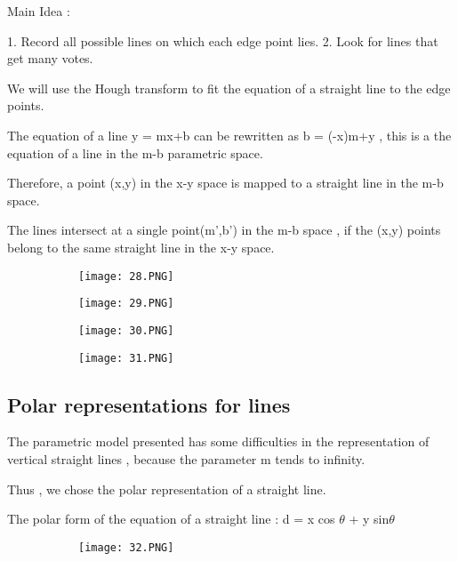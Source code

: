 \documentclass{article}
\begin{document}
Main Idea : 

1. Record all possible lines on which each edge point lies.
2. Look for lines that get many votes.

We will use the Hough transform to fit the equation of a straight line to the edge points.

The equation of a line y = mx+b can be rewritten as b = (-x)m+y , this is a the equation of a line in the m-b parametric space.

Therefore, a point (x,y) in the x-y space is mapped to a straight line in the m-b space.

The lines intersect at a single point(m',b') in the m-b space , if the (x,y) points belong to the same straight line in the x-y space.

\begin{figure}[ht!]
  \centering
  \begin{subfigure}[b]{0.4\linewidth}
    \texttt{[image: 28.PNG]}
  \end{subfigure}
  \begin{subfigure}[b]{0.4\textwidth}
         \centering
         \texttt{[image: 29.PNG]}
     \end{subfigure}
\end{figure}

\begin{figure}[ht!]
  \centering
  \begin{subfigure}[b]{0.4\linewidth}
    \texttt{[image: 30.PNG]}
  \end{subfigure}
  \begin{subfigure}[b]{0.4\textwidth}
         \centering
         \texttt{[image: 31.PNG]}
     \end{subfigure}
\end{figure}


\subsection{Polar representations for lines}

The parametric model presented has some difficulties in the representation of vertical straight lines , because the parameter m tends to infinity.

Thus , we chose the polar representation of a straight line.

The polar form of the equation of a straight line : d = x cos $\theta$ + y sin$\theta$

\begin{figure}[ht!]
  \centering
  \begin{subfigure}[b]{0.2\linewidth}
    \texttt{[image: 32.PNG]}
  \end{subfigure}
\end{figure}
\end{document}
